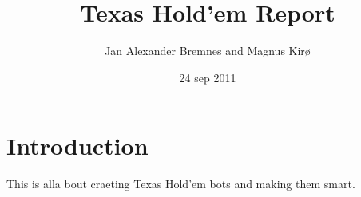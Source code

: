 \documentclass[12pt]{article}
\title{Texas Hold'em Report}
\author{Jan Alexander Bremnes and Magnus Kirø}
\date{24 sep 2011}
\begin{document}
\maketitle

\tableofcontents


\section*{Introduction}
This is alla bout craeting Texas Hold'em bots and making them smart.
\end{document}
